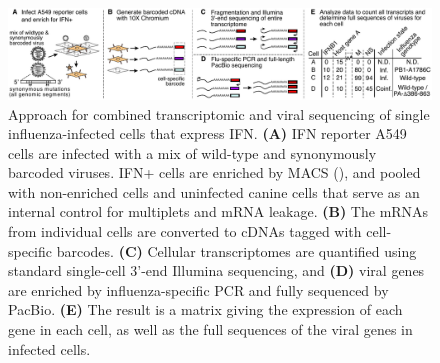 \documentclass[9pt,lineno]{elife}
\begin{document}
\begin{figure}
\begin{fullwidth}

\includegraphics[width=\linewidth, valign=t]{figures/WorkflowSchematic/SchematicForPaper.pdf}

\caption{
Approach for combined transcriptomic and viral sequencing of single influenza-infected cells that express IFN.
{\bf (A)}
IFN reporter A549 cells are infected with a mix of wild-type and synonymously barcoded viruses.
IFN+ cells are enriched by MACS (), and pooled with non-enriched cells and uninfected canine cells that serve as an internal control for multiplets and mRNA leakage.
{\bf (B)}
The mRNAs from individual cells are converted to cDNAs tagged with cell-specific barcodes.
{\bf (C)}
Cellular transcriptomes are quantified using standard single-cell 3'-end Illumina sequencing, and 
{\bf (D)}
viral genes are enriched by influenza-specific PCR and fully sequenced by PacBio.
{\bf (E)}
The result is a matrix giving the expression of each gene in each cell, as well as the full sequences of the viral genes in infected cells.
}
\label{fig:workflow}


\end{fullwidth}
\end{figure}
\end{document}
